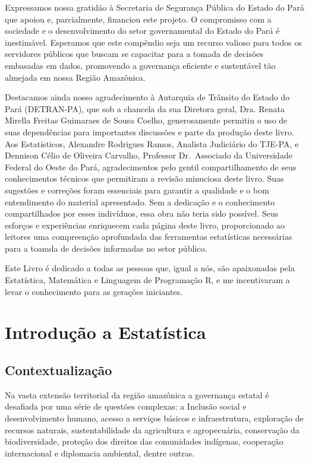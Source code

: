 \documentclass[
  letterpaper,
  DIV=11,
  numbers=noendperiod]{scrreprt}
\begin{document}
Expressamos nossa gratidão à Secretaria de Segurança Pública do Estado
do Pará que apoiou e, parcialmente, financiou este projeto. O
compromisso com a sociedade e o desenvolvimento do setor governamental
do Estado do Pará é inestimável. Esperamos que este compêndio seja um
recurso valioso para todos os servidores públicos que buscam se
capacitar para a tomada de decisões embasadas em dados, promovendo a
governança eficiente e sustentável tão almejada em nossa Região
Amazônica.

Destacamos ainda nosso agradecimento à Autarquia de Trânsito do Estado
do Pará (DETRAN-PA), que sob a chancela da sua Diretora geral, Dra.
Renata Mirella Freitas Guimaraes de Sousa Coelho, generosamente permitiu
o uso de suas dependências para importantes discussões e parte da
produção deste livro. Aos Estatísticos, Alexandre Rodrigues Ramos,
Analista Judiciário do TJE-PA, e Dennison Célio de Oliveira Carvalho,
Professor Dr.~Associado da Universidade Federal do Oeste do Pará,
agradecimentos pelo gentil compartilhamento de seus conhecimentos
técnicos que permitiram a revisão minuciosa deste livro. Suas sugestões
e correções foram essenciais para garantir a qualidade e o bom
entendimento do material apresentado. Sem a dedicação e o conhecimento
compartilhados por esses indivíduos, essa obra não teria sido possível.
Seus esforços e experiências enriquecem cada página deste livro,
proporcionado ao leitores uma compreenção aprofundada das ferramentas
estatísticas necessárias para a toamda de decisões informadas no setor
público.

Este Livro é dedicado a todas as pessoas que, igual a nós, são
apaixonadas pela Estatística, Matemática e Linguagem de Programação R, e
me incentivaram a levar o conhecimento para as gerações iniciantes.


\hypertarget{introduuxe7uxe3o-a-estatuxedstica}{%
\chapter{Introdução a
Estatística}\label{introduuxe7uxe3o-a-estatuxedstica}}

\hypertarget{contextualizauxe7uxe3o}{%
\section{Contextualização}\label{contextualizauxe7uxe3o}}

Na vasta extensão territorial da região amazônica a governança estatal é
desafiada por uma série de questões complexas: a Inclusão social e
desenvolvimento humano, acesso a serviços básicos e infraestrutura,
exploração de recursos naturais, sustentabilidade da agricultura e
agropecuária, conservação da biodiversidade, proteção dos direitos das
comunidades indígenas, cooperação internacional e diplomacia ambiental,
dentre outras.
\end{document}
